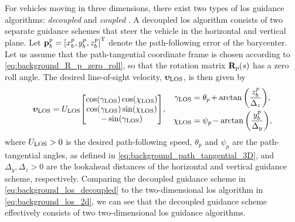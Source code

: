 For vehicles moving in three dimensions, there exist two types of \gls{los} guidance algorithms: \emph{decoupled} \cite{caharija_path_2012,abdurahman_switching_2019} and \emph{coupled} \cite{breivik_principles_2005,yu_nonlinear_2017,yu_LOS_2020}.
A decoupled \gls{los} algorithm consists of two separate guidance schemes that steer the vehicle in the horizontal and vertical plane.
Let $\mathbf{p}_b^p = \left[x_b^p, y_b^p, z_b^p\right]^{\mathrm{T}}$ denote the path-following error of the barycenter.
Let us assume that the path-tangential coordinate frame is chosen according to \eqref{eq:background_R_p_zero_roll}, so that the rotation matrix $\mathbf{R}_p(s)$ has a zero roll angle.
The desired line-of-sight velocity, $\bm{\upsilon}_{\rm LOS}$, is then given by
\begin{align}
    \bm{\upsilon}_{\rm LOS} &= U_{\rm LOS} \!
    \begin{bmatrix}
        \cos(\gamma_{\rm LOS}) \cos(\chi_{\rm LOS}) \\
        \cos(\gamma_{\rm LOS}) \sin(\chi_{\rm LOS}) \\
        -\sin(\gamma_{\rm LOS})
    \end{bmatrix}\!, &
    \begin{split}
        \gamma_{\rm LOS} &= \theta_{p\!} + \arctan\left(\frac{z_b^p}{\Delta_z}\right)\!, \\
        \chi_{\rm LOS} &= \psi_{p\!} - \arctan\left(\frac{y_b^p}{\Delta_y}\right)\!, \\
    \end{split}
    \label{eq:background_los_decoupled}
\end{align}
where $U_{\rm LOS} > 0$ is the desired path-following speed, $\theta_p$ and $\psi_p$ are the path-tangential angles, as defined in \eqref{eq:background_path_tangential_3D}, and $\Delta_y, \Delta_z > 0$ are the lookahead distances of the horizontal and vertical guidance scheme, respectively.
Comparing the decoupled guidance scheme in \eqref{eq:background_los_decoupled} to the two-dimensional \gls{los} algorithm in \eqref{eq:background_los_2d}, we can see that the decoupled guidance scheme effectively consists of two two-dimensional \gls{los} guidance algorithms.

